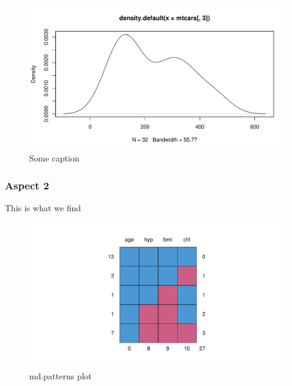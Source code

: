 \documentclass[a4paper,man,floatsintext,natbib]{apa6}\usepackage[]{graphicx}\usepackage[]{xcolor}
\makeatletter
\def\maxwidth{ %
  \ifdim\Gin@nat@width>\linewidth
    \linewidth
  \else
    \Gin@nat@width
  \fi
}
\newenvironment{knitrout}{}{} %
\makeatother
\begin{document}
	\begin{figure}
	\centering
\begin{knitrout}
\color{fgcolor}

{\centering \includegraphics[width=\maxwidth]{figure/plot-distribution-1} 

}


\end{knitrout}
		\caption{\label{fig:dist} Some caption }
	\end{figure}

\subsubsection{Aspect 2}

	This is what we find



	\begin{figure}
	\centering
\begin{knitrout}
\color{fgcolor}

{\centering \includegraphics[width=\maxwidth]{figure/plot-mice-1} 

}


\end{knitrout}
		\caption{\label{fig:mice} md.patterns plot }
	\end{figure}
\end{document}
